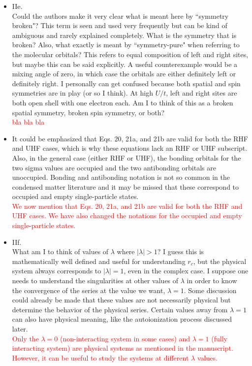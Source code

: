 \documentclass[10pt]{letter}
\newcommand{\alert}[1]{\textcolor{red}{#1}}
\begin{document}
\begin{letter}
\begin{itemize}
\item 
	{IIe.\\
	Could the authors make it very clear what is meant here by ``symmetry broken"? 
	This term is seen and used very frequently but can be kind of ambiguous and rarely explained completely. 
	What is the symmetry that is broken? 
	Also, what exactly is meant by ``symmetry-pure" when referring to the molecular orbitals? This refers to equal composition of left and right sites, but maybe this can be said explicitly. 
	A useful counterexample would be a mixing angle of zero, in which case the orbitals are either definitely left or definitely right.
	I personally can get confused because both spatial and spin symmetries are in play (or so I think). 
	At high $U/t$, left and right sites are both open shell with one electron each. 
	Am I to think of this as a broken spatial symmetry, broken spin symmetry, or both?}
	\\
	\alert{bla bla bla}

\item 
	{It could be emphasized that Eqs. 20, 21a, and 21b are valid for both the RHF and UHF cases, which is why these equations lack an RHF or UHF subscript. 
	Also, in the general case (either RHF or UHF), the bonding orbitals for the two sigma values are occupied and the two antibonding orbitals are unoccupied. 
	Bonding and antibonding notation is not so common in the condensed matter literature and it may be missed that these correspond to occupied and empty single-particle states.}
	\\
	\alert{We now mention that Eqs. 20, 21a, and 21b are valid for both the RHF and UHF cases.
	We have also changed the notations for the occupied and empty single-particle states.}

\item 
	{IIf.\\
	What am I to think of values of $\lambda$ where $|\lambda|>1$? 
	I guess this is mathematically well defined and useful for understanding $r_c$, but the physical system always corresponds to $|\lambda|=1$, even in the complex case. 
	I suppose one needs to understand the singularities at other values of $\lambda$ in order to know the convergence of the series at the value we want, $\lambda = 1$.
	Some discussion could already be made that these values are not necessarily physical but determine the behavior of the physical series. 
	Certain values away from $\lambda=1$ can also have physical meaning, like the autoionization process discussed later.}
	\\
	\alert{Only the $\lambda = 0$ (non-interacting system in some cases) and $\lambda = 1$ (fully interacting system) are physical systems  as mentioned in the manuscript.
	However, it can be useful to study the systems at different $\lambda$ values.}


\end{itemize}
\end{letter}
\end{document}
